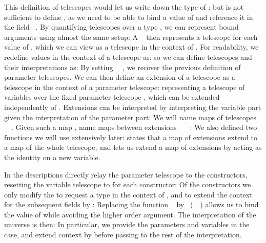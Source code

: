 This definition of telescopes would let us write down the type of :
but is not sufficient to define , as we need to be able to bind a value  of  and reference it in the field \ . By quantifying telescopes over a type \cite{practgen}, we can represent bound arguments using almost the same setup:
A \  then represents a telescope for each value of , which we can view as a telescope in the context of . For readability, we redefine values in the context of a telescope as:
so we can define telescopes and their interpretations as:
By setting \ \AV{=}\ , we recover the previous definition of parameter-telescopes. We can then define an extension of a telescope as a telescope in the context of a parameter telescope:
representing a telescope of variables over the fixed parameter-telescope , which can be extended independently of . Extensions can be interpreted by interpreting the variable part given the interpretation of the parameter part:
We will name maps  of telescopes \ \ . Given such a map , name maps  between extensions \ \ \ :
We also defined two functions we will use extensively later:  states that a map of extensions extend to a map of the whole telescope, and  lets us extend a map of extensions by acting as the identity on a new variable. 

In the descriptions directly relay the parameter telescope to the constructors, resetting the variable telescope to  for each constructor:
Of the constructors we only modify the  to request a type  in the context of , and to extend the context for the subsequent fields by :
Replacing the function \  by \ (\ \ ) allows us to bind the value of  while avoiding the higher order argument. The interpretation of the universe is then:
In particular, we provide  the parameters and variables in the  case, and extend context by  before passing to the rest of the interpretation.

